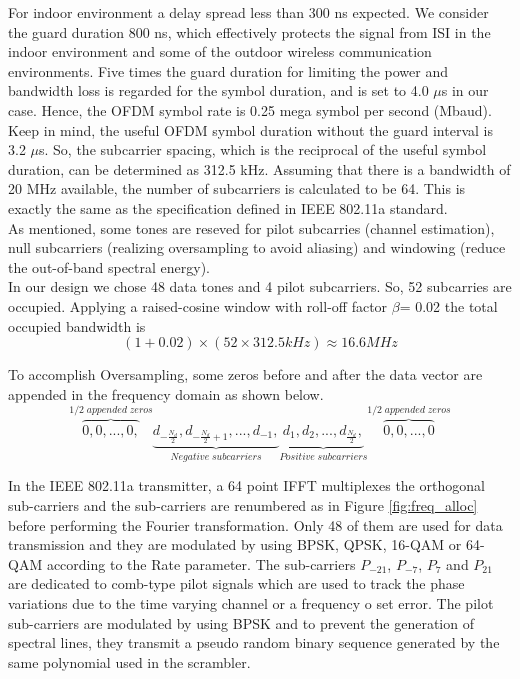 For indoor environment a delay spread less than 300 ns expected. We consider the guard duration 800 ns, which effectively protects the signal from ISI in the indoor environment and some of the outdoor wireless communication environments. Five times the guard duration for limiting the power and bandwidth loss is regarded for the symbol duration, and is set to 4.0 $\mu$s in our case. Hence, the OFDM symbol rate is 0.25 mega symbol per second (Mbaud).\\
Keep in mind, the useful OFDM symbol duration without the guard interval is 3.2 $\mu$s. So, the subcarrier spacing, which is the reciprocal of the useful symbol duration, can be determined as 312.5 kHz. Assuming that there is a bandwidth of 20 MHz available, the number of subcarriers is calculated to be 64. This is exactly the same as the specification defined in IEEE 802.11a standard.\\
As mentioned, some tones are reseved for pilot subcarries (channel estimation), null subcarriers (realizing oversampling to avoid aliasing) and windowing (reduce the out-of-band spectral energy).\\
In our design we chose 48 data tones and 4 pilot subcarriers. So, 52 subcarries are occupied. Applying a raised-cosine window with roll-off factor $\beta$= 0.02 the total occupied bandwidth is\\

\begin{equation} \label{occupied_bw}
(1+ 0.02)\times(52 \times 312.5kHz) \approx 16.6MHz
\end{equation}

To accomplish Oversampling, some zeros before and after the data vector are appended in the frequency domain as shown below.\\

\begin{equation} \label{over_sample}
\overbrace{0, 0, ... , 0,}^{1/2\;appended\;zeros}
\underbrace{d_{-\frac{N_d}{2}}, d_{-\frac{N_d}{2}+1}, ... , d_{-1},}_{Negative\;subcarriers}
\underbrace{d_{1}, d_{2}, ... , d_{\frac{N_d}{2}},}_{Positive\;subcarriers}
\overbrace{0, 0, ... , 0}^{1/2\;appended\;zeros}
\end{equation}

In the IEEE 802.11a transmitter, a 64 point IFFT multiplexes the orthogonal sub-carriers and the sub-carriers are renumbered as in Figure \ref{fig:freq_alloc} before performing the Fourier transformation. Only 48 of them are used for data transmission and they are modulated by using BPSK, QPSK, 16-QAM or 64-QAM according to the Rate parameter. The sub-carriers $P_{-21}$, $P_{-7}$, $P_{7}$ and $P_{21}$ are dedicated to comb-type pilot signals which are used to track the phase variations due to the time varying channel or a frequency o set error. The pilot sub-carriers are modulated by using BPSK and to prevent the generation of spectral lines, they transmit a pseudo random binary sequence generated by the same polynomial used in the scrambler.\\

